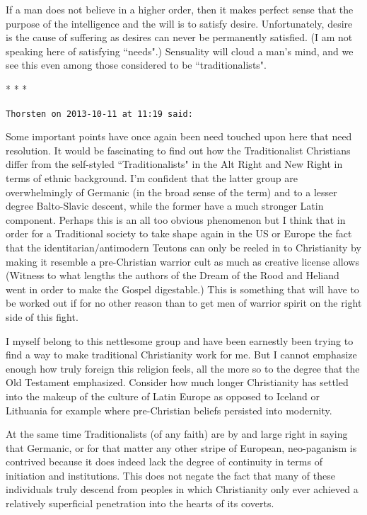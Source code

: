 If a man does not believe in a higher order, then it makes perfect sense that the purpose of the intelligence and the
will is to satisfy desire. Unfortunately, desire is the cause of suffering as desires can never be permanently
satisfied. (I am not speaking here of satisfying ``needs".) Sensuality will cloud a man's mind, and
we see this even among those considered to be ``traditionalists".




\begin{center}* * *\end{center}

\begin{footnotesize}\begin{sffamily}



\texttt{Thorsten on 2013-10-11 at 11:19 said: }

Some important points have once again been need touched upon here that need resolution. It would be fascinating to find
out how the Traditionalist Christians differ from the self-styled ``Traditionalists" in the Alt Right and New Right in
terms of ethnic background. I'm confident that the latter group are overwhelmingly of Germanic (in
the broad sense of the term) and to a lesser degree Balto-Slavic descent, while the former have a much stronger Latin
component. Perhaps this is an all too obvious phenomenon but I think that in order for a Traditional society to take
shape again in the US or Europe the fact that the identitarian/antimodern Teutons can only be reeled in to Christianity
by making it resemble a pre-Christian warrior cult as much as creative license allows (Witness to what lengths the
authors of the Dream of the Rood and Heliand went in order to make the Gospel digestable.) This is something that will
have to be worked out if for no other reason than to get men of warrior spirit on the right side of this fight.

I myself belong to this nettlesome group and have been earnestly been trying to find a way to make traditional
Christianity work for me. But I cannot emphasize enough how truly foreign this religion feels, all the more so to the
degree that the Old Testament emphasized. Consider how much longer Christianity has settled into the makeup of the
culture of Latin Europe as opposed to Iceland or Lithuania for example where pre-Christian beliefs persisted into
modernity.

At the same time Traditionalists (of any faith) are by and large right in saying that Germanic, or for that matter any
other stripe of European, neo-paganism is contrived because it does indeed lack the degree of continuity in terms of
initiation and institutions. This does not negate the fact that many of these individuals truly descend from peoples in
which Christianity only ever achieved a relatively superficial penetration into the hearts of its coverts.


\end{sffamily}
\end{footnotesize}
